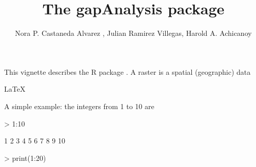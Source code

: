 \documentclass[a4paper]{article}
\title{The gapAnalysis package}
\author{Nora P. Castaneda Alvarez , Julian Ramirez Villegas, Harold A. Achicanoy}
\begin{document}



\maketitle

This vignette describes the R package \verb@Sweave@. A raster is a spatial (geographic) data

\LaTeX\

A simple example: the integers from 1 to 10 are
\begin{Schunk}
\begin{Sinput}
> 1:10
\end{Sinput}
\begin{Soutput}
 [1]  1  2  3  4  5  6  7  8  9 10
\end{Soutput}
\end{Schunk}
\begin{Schunk}
\begin{Sinput}
> print(1:20)
\end{Sinput}
\end{Schunk}
\end{document}

